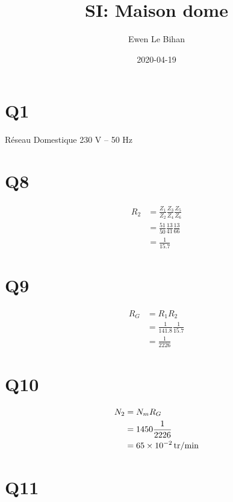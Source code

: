\documentclass{article}
\title{SI: Maison dome}
\author{Ewen Le Bihan}
\date{2020-04-19}
\newcommand{\rpm}{\text{tr}\per\minute}
\begin{document}
\maketitle

\section{Q1}

Réseau Domestique 230 V – 50 Hz

\section{Q8}

\begin{equation*}
  \begin{split}
    R_2 &= \frac{Z_1}{Z_2} \frac{Z_3}{Z_4} \frac{Z_5}{Z_6} \\
        &= \frac{51}{50} \frac{13}{41} \frac{13}{66} \\
        &= \frac{1}{15.7}
  \end{split}
\end{equation*}

\section{Q9}

\begin{equation*}
  \begin{split}
    R_G &= R_1 R_2 \\
        &= \frac{1}{141.8} \frac{1}{15.7} \\
        &= \frac{1}{2226}
  \end{split}
\end{equation*}

\section{Q10}

\begin{equation*}
  \begin{split}
    N_2 &= N_m R_G \\
        &= 1450 \frac{1}{2226} \\
        &= \SI{65E-2}{\rpm}
  \end{split}
\end{equation*}

\section{Q11}
\end{document}
